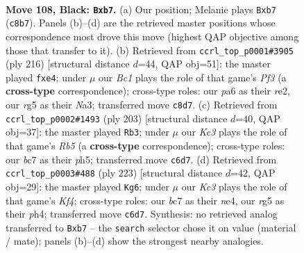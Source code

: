 \documentclass[11pt]{article}
\begin{document}
\clearpage

\begin{figure}[p]\centering
\begin{subfigure}{0.46\textwidth}\centering
\resizebox{\linewidth}{!}{%
\newchessgame
\chessboard[
  setfen={2b5/1PB5/P1k5/3N2R1/1K6/7p/8/8 b - - 0 108},
  showmover=false,
  pgfstyle=straightmove, color=movearrow, markmove={c8-b7}
]}
\caption{}
\end{subfigure}\hfill
\begin{subfigure}{0.46\textwidth}\centering
\resizebox{\linewidth}{!}{%
\newchessgame
\chessboard[
  setfen={8/5k2/R3b2p/4K3/4p2P/N4P2/4r3/8 w - - 0 109},
  showmover=false,
  pgfstyle=straightmove, color=movearrow, markmove={f3-e4}
]}
\caption{}
\end{subfigure}
\\[4pt]
\begin{subfigure}{0.46\textwidth}\centering
\resizebox{\linewidth}{!}{%
\newchessgame
\chessboard[
  setfen={8/5R2/8/3K2kP/1r3N2/8/8/8 b - - 36 102},
  showmover=false,
  pgfstyle=straightmove, color=movearrow, markmove={b4-b3}
]}
\caption{}
\end{subfigure}\hfill
\begin{subfigure}{0.46\textwidth}\centering
\resizebox{\linewidth}{!}{%
\newchessgame
\chessboard[
  setfen={8/7p/8/5k2/4Np1P/3K1P2/5B1r/8 b - - 82 112},
  showmover=false,
  pgfstyle=straightmove, color=movearrow, markmove={f5-g6}
]}
\caption{}
\end{subfigure}
\caption{\textbf{Move 108, Black: \texttt{Bxb7}.} (a) Our position; Melanie plays \texttt{Bxb7} (\texttt{c8b7}). Panels (b)--(d) are the retrieved master positions whose correspondence most drove this move (highest QAP objective among those that transfer to it). (b) Retrieved from \texttt{ccrl\_top\_p0001\#3905} (ply 216) [structural distance $d$=44, QAP obj=51]: the master played \texttt{fxe4}; under $\mu$ our \emph{Bc1} plays the role of that game's \emph{Pf3} (a \textbf{cross-type} correspondence); cross-type roles: our \emph{p}a6 as their \emph{r}e2, our \emph{r}g5 as their \emph{N}a3; transferred move \texttt{c8d7}. (c) Retrieved from \texttt{ccrl\_top\_p0002\#1493} (ply 203) [structural distance $d$=40, QAP obj=37]: the master played \texttt{Rb3}; under $\mu$ our \emph{Kc3} plays the role of that game's \emph{Rb5} (a \textbf{cross-type} correspondence); cross-type roles: our \emph{b}c7 as their \emph{p}h5; transferred move \texttt{c6d7}. (d) Retrieved from \texttt{ccrl\_top\_p0003\#488} (ply 223) [structural distance $d$=42, QAP obj=29]: the master played \texttt{Kg6}; under $\mu$ our \emph{Kc3} plays the role of that game's \emph{Kf4}; cross-type roles: our \emph{b}c7 as their \emph{n}e4, our \emph{r}g5 as their \emph{p}h4; transferred move \texttt{c6d7}. Synthesis: no retrieved analog transferred to \texttt{Bxb7} -- the \texttt{search} selector chose it on value (material / mate); panels (b)--(d) show the strongest nearby analogies.}
\label{fig:thought-m215}
\end{figure}
\end{document}
